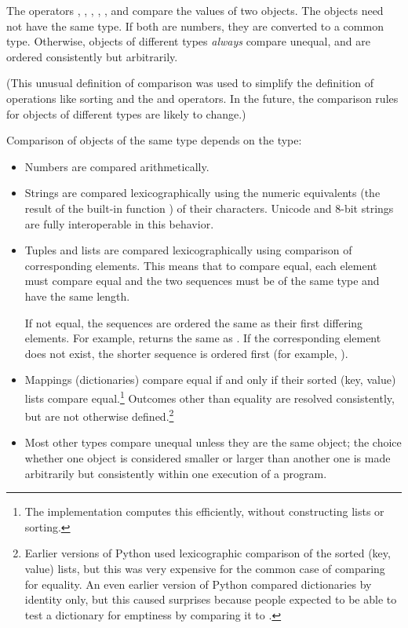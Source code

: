 The operators \code{<}, \code{>}, \code{==}, \code{>=}, \code{<=}, and
\code{!=} compare
the values of two objects.  The objects need not have the same type.
If both are numbers, they are converted to a common type.  Otherwise,
objects of different types \emph{always} compare unequal, and are
ordered consistently but arbitrarily.

(This unusual definition of comparison was used to simplify the
definition of operations like sorting and the  and
 operators.  In the future, the comparison rules for
objects of different types are likely to change.)

Comparison of objects of the same type depends on the type:

\begin{itemize}

\item
Numbers are compared arithmetically.

\item
Strings are compared lexicographically using the numeric equivalents
(the result of the built-in function ) of their
characters.  Unicode and 8-bit strings are fully interoperable in this
behavior.

\item
Tuples and lists are compared lexicographically using comparison of
corresponding elements.  This means that to compare equal, each
element must compare equal and the two sequences must be of the same
type and have the same length.

If not equal, the sequences are ordered the same as their first
differing elements.  For example,  returns
the same as .  If the corresponding element does not
exist, the shorter sequence is ordered first (for example,
\code{[1,2] < [1,2,3]}).

\item
Mappings (dictionaries) compare equal if and only if their sorted
(key, value) lists compare equal.\footnote{The implementation computes
   this efficiently, without constructing lists or sorting.}
Outcomes other than equality are resolved consistently, but are not
otherwise defined.\footnote{Earlier versions of Python used
  lexicographic comparison of the sorted (key, value) lists, but this
  was very expensive for the common case of comparing for equality.  An
  even earlier version of Python compared dictionaries by identity only,
  but this caused surprises because people expected to be able to test
  a dictionary for emptiness by comparing it to \code{\{\}}.}

\item
Most other types compare unequal unless they are the same object;
the choice whether one object is considered smaller or larger than
another one is made arbitrarily but consistently within one
execution of a program.

\end{itemize}

